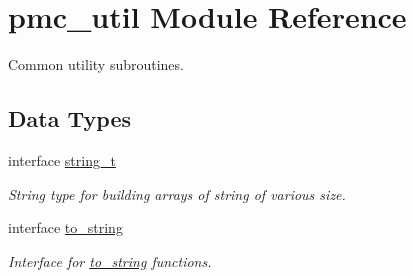 \hypertarget{namespacepmc__util}{}\section{pmc\+\_\+util Module Reference}
\label{namespacepmc__util}


Common utility subroutines.  


\subsection*{Data Types}
\begin{DoxyCompactItemize}
\item 
interface \mbox{\hyperlink{structpmc__util_1_1string__t}{string\+\_\+t}}
\begin{DoxyCompactList}\small\item\em String type for building arrays of string of various size. \end{DoxyCompactList}\item 
interface \mbox{\hyperlink{interfacepmc__util_1_1to__string}{to\+\_\+string}}
\begin{DoxyCompactList}\small\item\em Interface for \mbox{\hyperlink{interfacepmc__util_1_1to__string}{to\+\_\+string}} functions. \end{DoxyCompactList}\end{DoxyCompactItemize}
